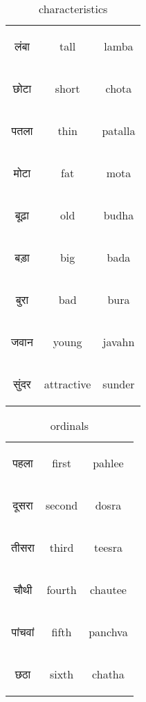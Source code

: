 \begin{table}[H]
    \centering
    \begin{tabular}{c|c|c}        
    \begin{hindi} लंबा  \end{hindi} & tall & lamba \\
    \begin{hindi} छोटा  \end{hindi} & short & chota \\
    \begin{hindi} पतला \end{hindi} & thin & patalla \\
    \begin{hindi} मोटा  \end{hindi} & fat & mota \\
    \begin{hindi} बूढ़ा  \end{hindi} & old & budha \\
    \begin{hindi} बड़ा  \end{hindi} & big & bada \\
    \begin{hindi} बुरा  \end{hindi} & bad & bura \\
    \begin{hindi} जवान \end{hindi} & young & javahn \\
    \begin{hindi} सुंदर   \end{hindi} & attractive & sunder \\
    \end{tabular}
    \caption{characteristics}
    \label{tab:adjective_colors}
\end{table}


\begin{table}[H]
    \centering
    \begin{tabular}{c|c|c}        
    \begin{hindi} पहला \end{hindi} & first & pahlee \\
    \begin{hindi} दूसरा  \end{hindi} & second & dosra \\
    \begin{hindi} तीसरा \end{hindi} & third & teesra \\
    \begin{hindi} चौथी  \end{hindi} & fourth & chautee \\
    \begin{hindi} पांचवां \end{hindi} & fifth & panchva \\
    \begin{hindi} छठा \end{hindi} & sixth & chatha \\
    \end{tabular}
    \caption{ordinals}
    \label{tab:adjective_ordinals}
\end{table}

